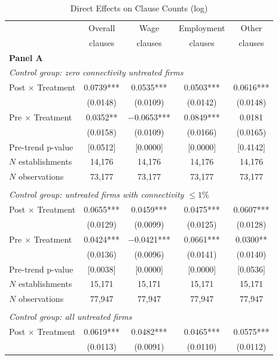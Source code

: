 \begin{table}[!htbp]
\centering
\caption{Direct Effects on Clause Counts (log)}
\label{tab:clause_count_log_direct}
\scriptsize
\begin{tabular}{lcccc}
\toprule
 & Overall & Wage & Employment & Other \\
 & clauses & clauses & clauses & clauses \\
\midrule
\multicolumn{5}{l}{\textbf{Panel A}}\\
\multicolumn{5}{l}{\textit{Control group: zero connectivity untreated firms}}\\
Post $\times$ Treatment & 0.0739*** & 0.0535*** & 0.0503*** & 0.0616***\\
 & (0.0148) & (0.0109) & (0.0142) & (0.0148)\\
Pre $\times$ Treatment & 0.0352** & $-$0.0653*** & 0.0849*** & 0.0181\\
 & (0.0158) & (0.0109) & (0.0166) & (0.0165)\\
Pre-trend p-value & [0.0512] & [0.0000] & [0.0000] & [0.4142]\\
$N$ establishments & 14{,}176 & 14{,}176 & 14{,}176 & 14{,}176\\
$N$ observations & 73{,}177 & 73{,}177 & 73{,}177 & 73{,}177\\
\addlinespace
\multicolumn{5}{l}{\textbf{Panel B}}\\
\multicolumn{5}{l}{\textit{Control group: untreated firms with connectivity $\leq 1\%$}}\\
Post $\times$ Treatment & 0.0655*** & 0.0459*** & 0.0475*** & 0.0607***\\
 & (0.0129) & (0.0099) & (0.0125) & (0.0128)\\
Pre $\times$ Treatment & 0.0424*** & $-$0.0421*** & 0.0661*** & 0.0300**\\
 & (0.0136) & (0.0096) & (0.0141) & (0.0140)\\
Pre-trend p-value & [0.0038] & [0.0000] & [0.0000] & [0.0536]\\
$N$ establishments & 15{,}171 & 15{,}171 & 15{,}171 & 15{,}171\\
$N$ observations & 77{,}947 & 77{,}947 & 77{,}947 & 77{,}947\\
\addlinespace
\multicolumn{5}{l}{\textbf{Panel C}}\\
\multicolumn{5}{l}{\textit{Control group: all untreated firms}}\\
Post $\times$ Treatment & 0.0619*** & 0.0482*** & 0.0465*** & 0.0575***\\
 & (0.0113) & (0.0091) & (0.0110) & (0.0112)\\

\end{tabular}
\end{table}
